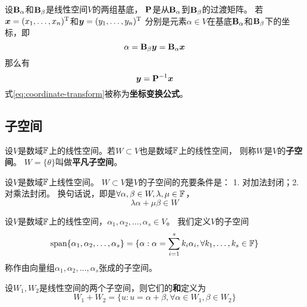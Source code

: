 \begin{theorem}[坐标变换公式]
  设$\mathbf{B}_{\alpha}$和$\mathbf{B}_{\beta}$是线性空间$V$的两组基底，
  $\mathbf{P}$是从$\mathbf{B}_{\alpha}$到$\mathbf{B}_{\beta}$的过渡矩阵。
  若$\bm{x}=(x_1,\dots,x_n)^{\textrm{T}}$和$\bm{y}=(y_1,\dots,y_n)^{\textrm{T}}$
  分别是元素$\alpha\in V$在基底$\mathbf{B}_{\alpha}$和$\mathbf{B}_{\beta}$下的坐标，即
  \[ \alpha = \mathbf{B}_{\beta}\bm{y} = \mathbf{B}_{\alpha}\bm{x} \]
  那么有
  \begin{equation} \label{eq:coordinate-transform}
    \bm{y} = \mathbf{P}^{-1}\bm{x}
  \end{equation}
  式\eqref{eq:coordinate-transform}被称为\textbf{坐标变换公式}。
\end{theorem}

\subsection{子空间}
\begin{definition}
  设$V$是数域$\mathbb{F}$上的线性空间。若$W\subset V$也是数域$\mathbb{F}$上的线性空间，
  则称$W$是$V$的\textbf{子空间}。
  $W=\{\theta\}$叫做\textbf{平凡子空间}。
\end{definition}

\begin{theorem}[子空间的充要条件]
  设$V$是数域$\mathbb{F}$上线性空间。
  $W\subset V$是$V$的子空间的充要条件是：
  1. 对加法封闭；2. 对乘法封闭。
  换句话说，即是$\forall\alpha,\beta\in W,\lambda,\mu\in\mathbb{F}$，
  \[ \lambda\alpha + \mu\beta \in W \]
\end{theorem}

\begin{definition}[子集张成的子空间]
    设$V$是数域$\mathbb{F}$上的线性空间，$\alpha_1,\alpha_2,\dots,\alpha_s\in V$。
    我们定义$V$的子空间
    \begin{displaymath}
    \textrm{span}\{ \alpha_1,\alpha_2,\dots,\alpha_s \} =
    \{ \alpha: \alpha=\sum_{i=1}^{s}k_i\alpha_i, \forall k_1,\dots,k_s\in\mathbb{F} \}
    \end{displaymath}
    称作由向量组$\alpha_1,\alpha_2,\dots,\alpha_s$张成的子空间。
\end{definition}

\begin{definition}[线性空间的和]
  设$W_1,W_2$是线性空间的两个子空间，则它们的\textbf{和}定义为
  \begin{displaymath}
    W_1+W_2 = \{ u: u=\alpha+\beta, \forall\alpha\in W_1,\beta\in W_2 \}
  \end{displaymath}
\end{definition}

